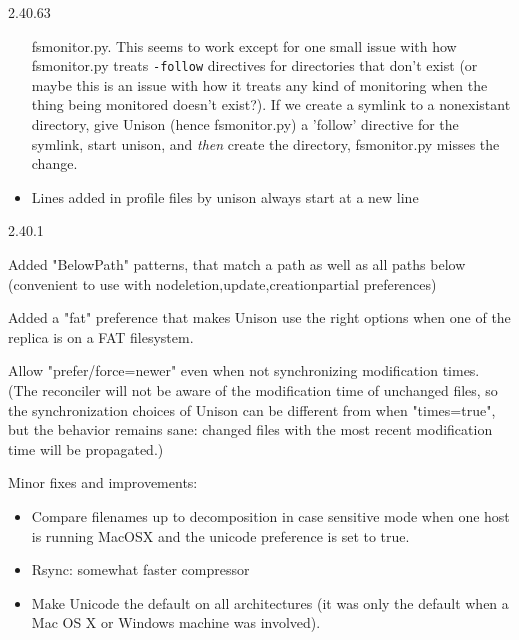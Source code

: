 \begin{changesfromversion}{2.40.63}
\begin{itemize}
  fsmonitor.py.  This seems to work except for one small issue with
  how fsmonitor.py treats {\tt -follow} directives for directories that
  don't exist (or maybe this is an issue with how it treats any kind
  of monitoring when the thing being monitored doesn't exist?).  If we
  create a symlink to a nonexistant directory, give Unison (hence
  fsmonitor.py) a 'follow' directive for the symlink, start unison, and
  {\em then} create the directory, fsmonitor.py misses the change.
\item Lines added in profile files by unison always start at a new line
\end{itemize}
\end{changesfromversion}

\begin{changesfromversion}{2.40.1}
\item Added "BelowPath" patterns, that match a path as well as all paths below
  (convenient to use with no{deletion,update,creation}partial preferences)
\item Added a "fat" preference that makes Unison use the right options
  when one of the replica is on a FAT filesystem.
\item Allow "prefer/force=newer" even when not synchronizing modification
  times.  (The reconciler will not be aware of the modification time
  of unchanged files, so the synchronization choices of Unison can be
  different from when "times=true", but the behavior remains sane:
  changed files with the most recent modification time will be
  propagated.)
\item Minor fixes and improvements:
\begin{itemize}
\item Compare filenames up to decomposition in case sensitive mode when
  one host is running MacOSX and the unicode preference is set to
  true.
\item Rsync: somewhat faster compressor
\item Make Unicode the default on all architectures (it was only the
  default when a Mac OS X or Windows machine was involved).
\end{itemize}
\end{changesfromversion}

